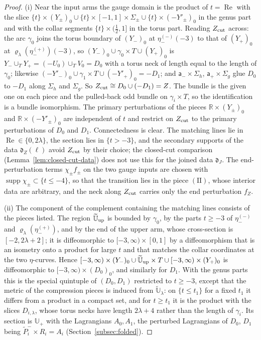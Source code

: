 \documentclass[11pt]{amsart}
\theoremstyle{definition}
\theoremstyle{remark}
\theoremstyle{plain}
\numberwithin{equation}{section}
\newcommand{\RR}{\mathbb{R}}
\begin{document}
\begin{proof}
(i) Near the input arms the gauge domain is the product of $t=\operatorname{Re}$
with the slice $\{t\}\times(Y_\pm)_0\cup\{t\}\times[-1,1]\times\Sigma_\pm\cup\{t\}\times(-Y'_\pm)_0$ in
the genus part and with the collar segments $\{t\}\times(\tfrac12,1]$ in the torus part.
Reading $Z_{\rm cut}$ across: the arc $\gamma_0$ joins the torus boundary of $(Y_-)_0$ at
$\eta^{(-)}_-(-3)$ to that of $(Y_+)_0$ at $\varrho_\lambda(\eta^{(+)}_-)(-3)$, so
$(Y_-)_0\cup\gamma_0\times T\cup(Y_+)_0$ is $Y_-\cup_T Y_+=(-U_0)\cup_TV_0=D_0$ with a torus neck of
length equal to the length of $\gamma_0$; likewise
$(-Y'_-)_0\cup\gamma_1\times T\cup(-Y'_+)_0=-D_1$; and $\mathsf a_-\times\Sigma_h$,
$\mathsf a_+\times\Sigma_g$ glue $D_0$ to $-D_1$ along $\Sigma_h$ and $\Sigma_g$. So
$Z_{\rm cut}\cong D_0\cup(-D_1)=Z$. The bundle is the given one on each piece and the
pulled-back odd bundle on $\gamma_i\times T$, so the identification is a bundle
isomorphism. The primary perturbations of the pieces $\RR\times(Y_\pm)_0$ and
$\RR\times(-Y'_\pm)_0$ are independent of $t$ and restrict on $Z_{\rm cut}$ to the primary
perturbations of $D_0$ and $D_1$. Connectedness is clear. The matching lines lie
in $\operatorname{Re}\in\{0,2\lambda\}$, the section lies in $\{t>-3\}$, and the
secondary supports of the data $\mathfrak d_Z(\ell)$ avoid $Z_{\rm cut}$ by their
choice; the closed-cut comparison (Lemma~\ref{lem:closed-cut-data}) does not use this
for the joined data $\mathfrak d_J$. The end-perturbation terms $\chi_\pm f_\pm$ on
the two gauge inputs are chosen with $\operatorname{supp}\chi_\pm\subset\{t\le-4\}$, so
that the transition lies in the piece $\mathrm{(II)}$, whose interior data are
arbitrary, and the neck along $Z_{\rm cut}$ carries only the end perturbation
$f_Z$.

(ii) The component of the complement containing the matching lines consists of
the pieces listed. The region $\widetilde{\mathbb U}_{\rm up}$ is bounded by $\gamma_0$, by the
parts $t\ge-3$ of $\eta^{(-)}_-$ and $\varrho_\lambda(\eta^{(+)}_-)$, and by the end of the
upper arm, whose cross-section is $[-2,2\lambda+2]$; it is diffeomorphic to
$[-3,\infty)\times[0,1]$ by a diffeomorphism that is an isometry onto a product for large
$t$ and that matches the collar coordinates at the two $\eta$-curves. Hence
$[-3,\infty)\times(Y_-)_0\cup\widetilde{\mathbb U}_{\rm up}\times T\cup[-3,\infty)\times(Y_+)_0$ is
diffeomorphic to $[-3,\infty)\times(D_0)_0$, and similarly for $D_1$. With the genus
parts this is the special quintuple of $(D_0,D_1)$ restricted to $t\ge-3$, except
that the metric of the compression pieces is induced from $\widetilde{\mathbb U}_\lambda$: on
$\{t\le t_1\}$ for a fixed $t_1$ it differs from a product in a compact set, and for
$t\ge t_1$ it is the product with the slices $D_{i,\lambda}$, whose torus necks have length
$2\lambda+4$ rather than the length of $\gamma_i$. Its section is $\mathbb U_+$ with
the Lagrangians $A_0,A_1$, the perturbed Lagrangians of $D_0$, $D_1$ being
$\widetilde P_i^-\times R_i=A_i$ (Section~\ref{subsec:folded}).


\end{proof}
\end{document}
